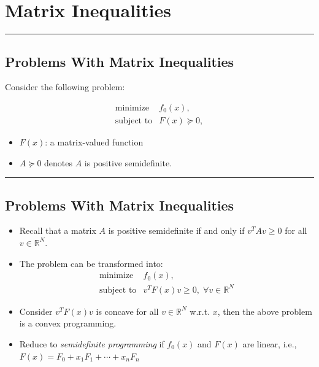 \documentclass[]{article}
\providecommand{\tightlist}{%
  \setlength{\itemsep}{0pt}\setlength{\parskip}{0pt}}
\begin{document}
\hypertarget{matrix-inequalities}{%
\section{Matrix Inequalities}\label{matrix-inequalities}}

\begin{center}\rule{0.5\linewidth}{\linethickness}\end{center}

\hypertarget{problems-with-matrix-inequalities}{%
\subsection{Problems With Matrix
Inequalities}\label{problems-with-matrix-inequalities}}

Consider the following problem:

\[\begin{array}{ll}
    \text{minimize}    & f_0(x), \\
    \text{subject to}  & F(x) \succeq 0,
\end{array}\]

\begin{itemize}
\tightlist
\item
  \(F(x)\): a matrix-valued function
\item
  \(A \succeq 0\) denotes \(A\) is positive semidefinite.
\end{itemize}

\begin{center}\rule{0.5\linewidth}{\linethickness}\end{center}

\hypertarget{problems-with-matrix-inequalities-1}{%
\subsection{Problems With Matrix
Inequalities}\label{problems-with-matrix-inequalities-1}}

\begin{itemize}
\tightlist
\item
  Recall that a matrix \(A\) is positive semidefinite if and only if
  \(v^T A v \ge 0\) for all \(v \in \mathbb{R}^N\).
\item
  The problem can be transformed into: \[\begin{array}{ll}
            \text{minimize}      & f_0(x), \\
            \text{subject to}    & v^T F(x) v \ge 0, \; \forall v \in \mathbb{R}^N
    \end{array}\]
\item
  Consider \(v^T F(x) v\) is concave for all \(v \in \mathbb{R}^N\)
  w.r.t. \(x\), then the above problem is a convex programming.
\item
  Reduce to \emph{semidefinite programming} if \(f_0(x)\) and \(F(x)\)
  are linear, i.e., \(F(x) = F_0 + x_1 F_1 + \cdots + x_n F_n\)
\end{itemize}
\end{document}
